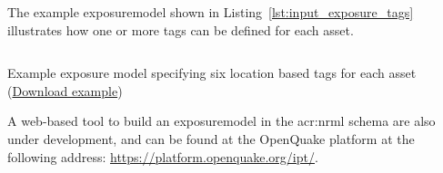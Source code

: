 The example
\gls{exposuremodel} shown in Listing~\ref{lst:input_exposure_tags} illustrates
how one or more \glspl{tag} can be defined for each \gls{asset}.

\begin{listing}[htbp]
  \inputminted[firstline=1,firstnumber=1,fontsize=\footnotesize,frame=single,linenos,bgcolor=lightgray]{xml}{oqum/risk/verbatim/input_exposure_tags.xml}
  \caption{Example exposure model specifying six location based tags for each asset (\href{https://raw.githubusercontent.com/GEMScienceTools/oq-engine-docs/master/oqum/risk/verbatim/input_exposure_tags.xml}{Download example})}
  \label{lst:input_exposure_tags}
\end{listing}


A web-based tool to build an \gls{exposuremodel} in the \gls{acr:nrml} schema
are also under development, and can be found at the OpenQuake platform at the
following address: \href{https://platform.openquake.org/ipt/}{https://platform.openquake.org/ipt/}.
